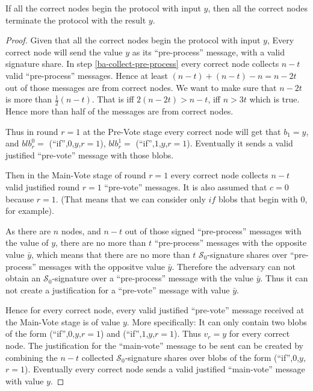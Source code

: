\begin{lem}
  If all the correct nodes begin the protocol with input $y$, then all the
  correct nodes terminate the protocol with the result $y$.
\end{lem}
\begin{proof}
  Given that all the correct nodes begin the protocol with input $y$, Every
  correct node will send the value $y$ as its ``pre-process'' message, with a
  valid signature share. In step \ref{ba-collect-pre-process} every correct node
  collects $n-t$ valid ``pre-process'' messages. Hence at least $(n-t) + (n-t)
  - n = n-2t$ out of those messages are from correct nodes. We want to make sure
  that $n-2t$ is more than $\frac{1}{2}(n-t)$. That is iff $2(n-2t) > n-t$, iff
  $n > 3t$ which is true. Hence more than half of the messages are from correct
  nodes.

  Thus in round $r=1$ at the Pre-Vote stage every correct node will get that
  $b_1 = y$, and ${blb}_r^0 =$ (``if'',$0$,$y$,$r=1$), ${blb}_r^1 =$
  (``if'',$1$,$y$,$r=1$). Eventually it sends a valid justified ``pre-vote''
  message with those blobs.

  Then in the Main-Vote stage of round $r=1$ every correct node collects $n-t$
  valid justified round $r=1$ ``pre-vote'' messages. It is also assumed that
  $c=0$ because $r=1$. (That means that we can consider only $if$ blobs that
  begin with $0$, for example). 
  
  As there are $n$ nodes, and $n-t$ out of those signed ``pre-process'' messages
  with the value of $y$, there are no more than $t$ ``pre-process'' messages
  with the opposite value $\bar{y}$, which means that there are no more than $t$
  $\mathcal{S}_0$-signature shares over ``pre-process'' messages with the
  oppositve value $\bar{y}$. Therefore the adversary can not obtain an
  $\mathcal{S}_0$-signature over a ``pre-process'' message with the value
  $\bar{y}$. Thus it can not create a justification for a ``pre-vote'' message
  with value $\bar{y}$.
  
  Hence for every correct node, every valid justified ``pre-vote'' message
  received at the Main-Vote stage is of value $y$. More specifically: It
  can only contain two blobs of the form (``if'',$0$,$y$,$r=1$) and
  (``if'',$1$,$y$,$r=1$). Thus $v_r = y$ for every correct node. The
  justification for the ``main-vote'' message to be sent can be created by
  combining the $n-t$ collected $\mathcal{S}_0$-signature shares over blobs of
  the form (``if'',$0$,$y$,$r=1$). Eventually every correct node sends a valid
  justified ``main-vote'' message with value $y$.


\end{proof}
